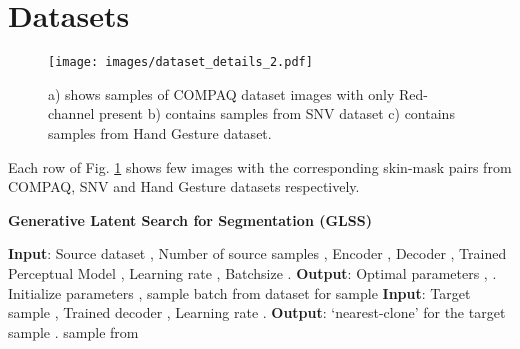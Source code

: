 \documentclass[runningheads]{llncs}
\begin{document}
\maketitle
\section{Datasets}
\begin{figure}[h]
\begin{center}
\texttt{[image: images/dataset\_details\_2.pdf]}
    \caption{a) shows samples of COMPAQ dataset \cite{jones2002statistical} images with only Red-channel present b) contains samples from SNV dataset c) contains samples from Hand Gesture dataset.
    }
    \label{fig:DatasetExample}
\end{center}
\end{figure}
Each row of Fig. \ref{fig:DatasetExample} shows few images with the corresponding skin-mask pairs from  COMPAQ, SNV and Hand Gesture datasets respectively.
\begin{algorithm}[bth!]
\caption{\textbf{Generative Latent Search for Segmentation (GLSS)}}
    \label{alg:trainalgo}


    \hspace*{\algorithmicindent} 
    
    \begin{algorithmic}[1] \vspace*{.1cm}
    \textbf{Input}: Source dataset , Number of source samples , Encoder , Decoder , Trained Perceptual Model , Learning rate , Batchsize . \textbf{Output}: Optimal parameters , .
    \State Initialize parameters , 
    \REPEAT
\State sample batch  from dataset  for   
\State 
    \State sample  
\vspace*{0.02cm}
    \State  
    \vspace*{0.06cm}
    \State 
    \vspace*{0.02cm}
    \State 
    \State  
    \State  
    \State  
{}
    \vspace*{.35cm}
     \textbf{Input}: Target sample , Trained decoder , Learning rate . \textbf{Output}: `nearest-clone'   for the target sample .  
    \State sample  from 
    \REPEAT


\State 
    \State 
    \State  \State 
\end{algorithmic}
\end{algorithm}
\end{document}
